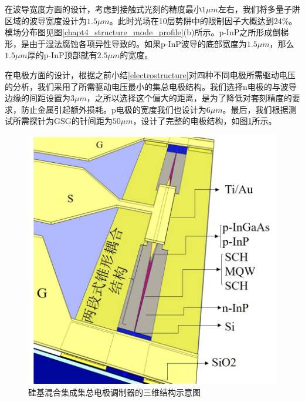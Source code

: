 在波导宽度方面的设计，考虑到接触式光刻的精度最小$1 \mu m$左右，我们将多量子阱区域的波导宽度设计为$1.5 \mu m$。此时光场在10层势阱中的限制因子大概达到24\%。模场分布图见图\ref{chapt4_structure_mode_profile}(b)所示。p-InP之所形成倒梯形，是由于湿法腐蚀各项异性导致的。如果p-InP波导的底部宽度为$1.5 \mu m$，那么$1.5 \mu m$厚的p-InP顶部就有$2.5 \mu m$的宽度。

在电极方面的设计，根据之前小结\ref{electrostructure}对四种不同电极所需驱动电压的分析，我们采用了所需驱动电压最小的集总电极结构。我们选择n电极的与波导边缘的间距设置为$3\mu m$，之所以选择这个偏大的距离，是为了降低对套刻精度的要求，防止金属引起额外损耗。p电极的宽度我们也设计为$6 \mu m$。最后，我们根据测试所需探针为GSG的针间距为$50 \mu m$，设计了完整的电极结构，如图\ref{chapt4_3D_structure}所示。

\begin{figure}[htb]
	\centering
	\includegraphics[width=12cm]{./Pictures/chapt4_3D_structure.jpg}
	\caption{ 硅基混合集成集总电极调制器的三维结构示意图}
	\label{chapt4_3D_structure}
\end{figure}

